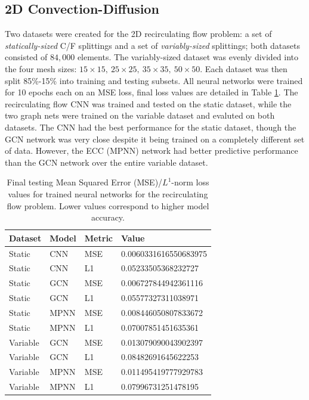 \documentclass[review]{siamart190516}
\begin{document}
\subsection{2D Convection-Diffusion}

Two datasets were created for the 2D recirculating flow problem: a set of \textit{statically-sized} C/F splittings and a set of \textit{variably-sized} splittings; both datasets consisted of $84,000$ elements.  The variably-sized dataset was evenly divided into the four mesh sizes: $15\times 15,\: 25\times 25,\: 35\times 35,\: 50\times 50$.  Each dataset was then split 85\%-15\% into training and testing subsets.  All neural networks were trained for 10 epochs each on an MSE loss, final loss values are detailed in Table \ref{tab:conv_loss}.  The recirculating flow CNN was trained and tested on the static dataset, while the two graph nets were trained on the variable dataset and evaluted on both datasets.  The CNN had the best performance for the static dataset, though the GCN network was very close despite it being trained on a completely different set of data.  However, the ECC (MPNN) network had better predictive performance than the GCN network over the entire variable dataset.

\begin{table}[t]
\centering
\begin{tabular}{|l|l|l|l|}
\hline
Dataset & Model & Metric & Value \\
\hline
Static & CNN & MSE & 0.0060331616550683975 \\
Static & CNN & L1 & 0.05233505368232727 \\
\hline
Static & GCN & MSE & 0.006727844942361116 \\
Static & GCN & L1 & 0.05577327311038971 \\
\hline
Static & MPNN & MSE & 0.008446050807833672 \\
Static & MPNN & L1 & 0.07007851451635361 \\
\hline
Variable & GCN & MSE & 0.013079090043902397 \\
Variable & GCN & L1 & 0.08482691645622253 \\
\hline
Variable & MPNN & MSE & 0.011495419777929783 \\
Variable & MPNN & L1 & 0.07996731251478195 \\
\hline
\end{tabular}
\caption{Final testing Mean Squared Error (MSE)/$L^1$-norm loss values for trained neural networks for the recirculating flow problem.  Lower values correspond to higher model accuracy.}
\label{tab:conv_loss}
\end{table}
\end{document}
